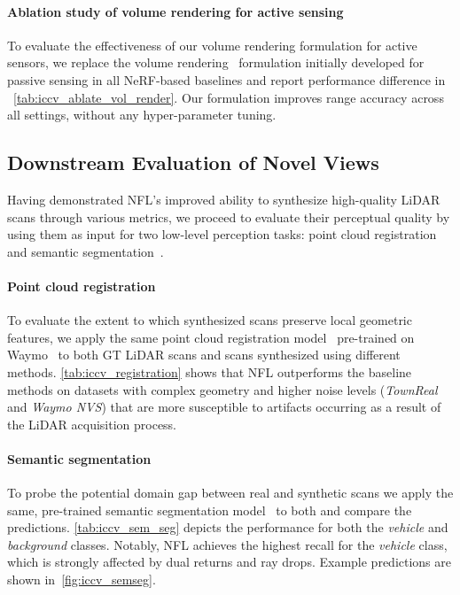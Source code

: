 \paragraph{Ablation study of volume rendering for active sensing}
To evaluate the effectiveness of our volume rendering formulation for active sensors, we replace the volume rendering~\cite{mildenhall2020nerf} formulation initially developed for passive sensing in all NeRF-based baselines and report performance difference in ~\cref{tab:iccv_ablate_vol_render}. Our formulation improves range accuracy across all settings, without any hyper-parameter tuning.







\subsection{Downstream Evaluation of Novel Views}
\label{sec:perceptual_quality} 
Having demonstrated NFL's improved ability to synthesize high-quality LiDAR scans through various metrics, we proceed to evaluate their perceptual quality by using them as input for two low-level perception tasks: point cloud registration~\cite{huang2021predator} and semantic segmentation~\cite{tang2020searching}.


\paragraph{Point cloud registration}
To evaluate the extent to which synthesized scans preserve local geometric features, we apply the same point cloud registration model~\cite{huang2022dynamic} pre-trained on Waymo~\cite{sun2020scalability} to both GT LiDAR scans and scans synthesized using different methods. \cref{tab:iccv_registration} shows that NFL outperforms the baseline methods on datasets with complex geometry and higher noise levels (\textit{TownReal} and \textit{Waymo NVS}) that are more susceptible to artifacts occurring as a result of the LiDAR acquisition process.





\paragraph{Semantic segmentation}
To probe the potential domain gap between real and synthetic scans we apply the same, pre-trained semantic segmentation model~\cite{tang2020searching} to both and compare the predictions. \cref{tab:iccv_sem_seg} depicts the performance for both the \textit{vehicle} and \textit{background} classes. Notably, NFL achieves the highest recall for the \textit{vehicle} class, which is strongly affected by dual returns and ray drops. Example predictions are shown in~\cref{fig:iccv_semseg}.
